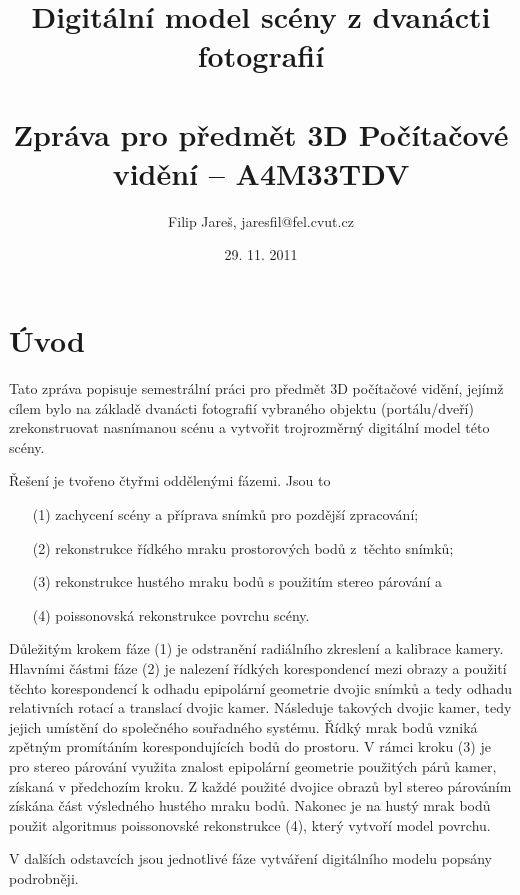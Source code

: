 \documentclass[11pt,oneside,a4paper,pdftex]{article}   %
\title{Digitální model scény z dvanácti fotografií \\ \ \\ \large Zpráva pro předmět 3D Počítačové vidění -- A4M33TDV}
\date{29. 11. 2011}
\author{Filip Jareš, jaresfil@fel.cvut.cz}
\begin{document}
\maketitle


\section*{Úvod}

	Tato zpráva popisuje semestrální práci pro předmět 3D počítačové vidění, jejímž cílem bylo na základě
	dvanácti fotografií vybraného objektu (portálu/dveří) zrekonstruovat nasnímanou scénu a vytvořit
	trojrozměrný digitální model této scény.
	
	Řešení je tvořeno čtyřmi oddělenými fázemi. Jsou to
	\begin{enumerate}
		\item[(1)]	zachycení scény a příprava snímků pro pozdější zpracování;
		\item[(2)]	rekonstrukce řídkého mraku prostorových bodů z~těchto snímků;
		\item[(3)]	rekonstrukce hustého mraku bodů s použitím stereo párování a
		\item[(4)]	poissonovská rekonstrukce povrchu scény.
	\end{enumerate}
	
	Důležitým krokem fáze (1) je odstranění radiálního zkreslení a kalibrace kamery. Hlavními částmi fáze
	(2) je nalezení řídkých korespondencí mezi obrazy a použití těchto korespondencí k odhadu epipolární
	geometrie dvojic snímků a tedy odhadu relativních rotací a translací dvojic kamer.  Následuje
	 takových dvojic kamer, tedy jejich umístění do společného souřadného systému. Řídký
	mrak bodů vzniká zpětným promítáním korespondujících bodů do prostoru. V rámci kroku (3) je pro
	stereo párování využita znalost epipolární geometrie použitých párů kamer, získaná v předchozím
	kroku.  Z každé použité dvojice obrazů byl stereo párováním získána část výsledného hustého mraku
	bodů.  Nakonec je na hustý mrak bodů použit algoritmus poissonovské rekonstrukce (4), který vytvoří
	model povrchu.
	
	V dalších odstavcích jsou jednotlivé fáze vytváření digitálního modelu popsány podrobněji.
\end{document}

